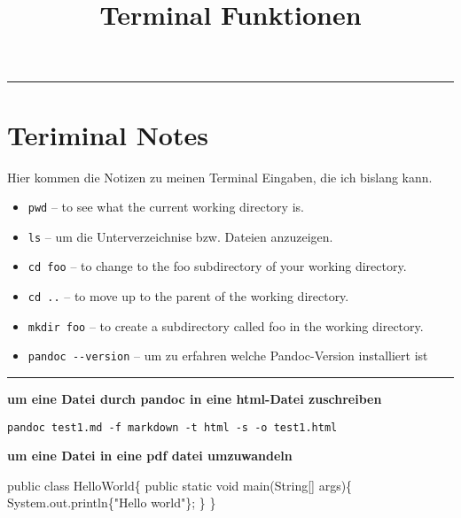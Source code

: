 \documentclass[]{article}
\title{Terminal Funktionen}
\author{}
\date{}
\newenvironment{Shaded}{\begin{snugshade}}{\end{snugshade}}
\newcommand{\KeywordTok}[1]{\textcolor[rgb]{0.94,0.87,0.69}{{#1}}}
\newcommand{\DataTypeTok}[1]{\textcolor[rgb]{0.87,0.87,0.75}{{#1}}}
\newcommand{\StringTok}[1]{\textcolor[rgb]{0.80,0.58,0.58}{{#1}}}
\newcommand{\FunctionTok}[1]{\textcolor[rgb]{0.94,0.94,0.56}{{#1}}}
\newcommand{\NormalTok}[1]{\textcolor[rgb]{0.80,0.80,0.80}{{#1}}}
\begin{document}
\maketitle


{
\hypersetup{linkcolor=black}
\setcounter{tocdepth}{2}
\tableofcontents
}
\begin{center}\rule{0.5\linewidth}{\linethickness}\end{center}

\section{Teriminal Notes}\label{teriminal-notes}

Hier kommen die Notizen zu meinen Terminal Eingaben, die ich bislang
kann.

\begin{itemize}
\itemsep1pt\parskip0pt
\item
  \texttt{pwd} -- to see what the current working directory is.
\item
  \texttt{ls} -- um die Unterverzeichnise bzw. Dateien anzuzeigen.
\item
  \texttt{cd foo} -- to change to the foo subdirectory of your working
  directory.
\item
  \texttt{cd ..} -- to move up to the parent of the working directory.
\item
  \texttt{mkdir foo} -- to create a subdirectory called foo in the
  working directory.
\item
  \texttt{pandoc -\/-version} -- um zu erfahren welche Pandoc-Version
  installiert ist
\end{itemize}

\begin{center}\rule{0.5\linewidth}{\linethickness}\end{center}

\textbf{um eine Datei durch pandoc in eine html-Datei zuschreiben}

\begin{verbatim}
pandoc test1.md -f markdown -t html -s -o test1.html
\end{verbatim}

\textbf{um eine Datei in eine pdf datei umzuwandeln}

\begin{Shaded}
\begin{Highlighting}[]
\KeywordTok{public} \KeywordTok{class} \NormalTok{HelloWorld\{}
    \KeywordTok{public} \DataTypeTok{static} \DataTypeTok{void} \FunctionTok{main}\NormalTok{(String[] args)\{}
        \NormalTok{System.}\FunctionTok{out}\NormalTok{.}\FunctionTok{println}\NormalTok{\{}\StringTok{"Hello world"}\NormalTok{\};}
    \NormalTok{\}}
\NormalTok{\}}
\end{Highlighting}
\end{Shaded}
\end{document}

